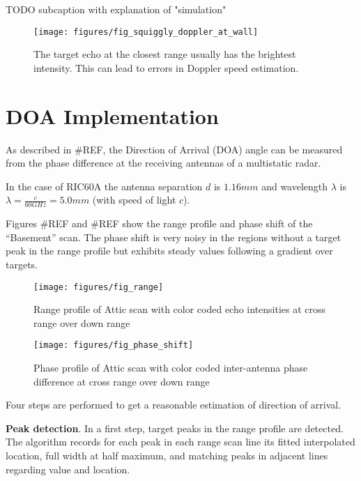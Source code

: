 TODO subcaption with explanation of "simulation"
\begin{figure}[htp]
    \centering
    \label{fig:fig_squiggly_doppler_at_wall}
    \texttt{[image: figures/fig\_squiggly\_doppler\_at\_wall]}
    \caption{The target echo at the closest range usually has the brightest intensity. This can lead to errors in Doppler speed estimation.}
\end{figure}

\section{DOA Implementation}\label{doa-implementation}

As described in \#REF, the Direction of Arrival (DOA) angle can be
measured from the phase difference at the receiving antennas of a
multistatic radar.

In the case of RIC60A the antenna separation \(d\) is \(1.16mm\) and
wavelength \(\lambda\) is \(\lambda=\frac{c}{60GHz}=5.0mm\) (with speed
of light \(c\)).

Figures \#REF and \#REF show the range profile and phase shift of the
``Basement'' scan. The phase shift is very noisy in the regions without
a target peak in the range profile but exhibits steady values following
a gradient over targets.

\begin{figure}[htp]
    \centering
    \label{fig:fig_range}
    \texttt{[image: figures/fig\_range]}
    \caption{Range profile of Attic scan with color coded echo intensities at cross range over down range}
\end{figure}

\begin{figure}[htp]
    \centering
    \label{fig:fig_phase_shift}
    \texttt{[image: figures/fig\_phase\_shift]}
    \caption{Phase profile of Attic scan with color coded inter-antenna phase difference at cross range over down range}
\end{figure}

Four steps are performed to get a reasonable estimation of direction of
arrival.

\textbf{Peak detection}. In a first step, target peaks in the
range profile are detected. The algorithm records for each peak in each
range scan line its fitted interpolated location, full width at half
maximum, and matching peaks in adjacent lines regarding value and
location.

